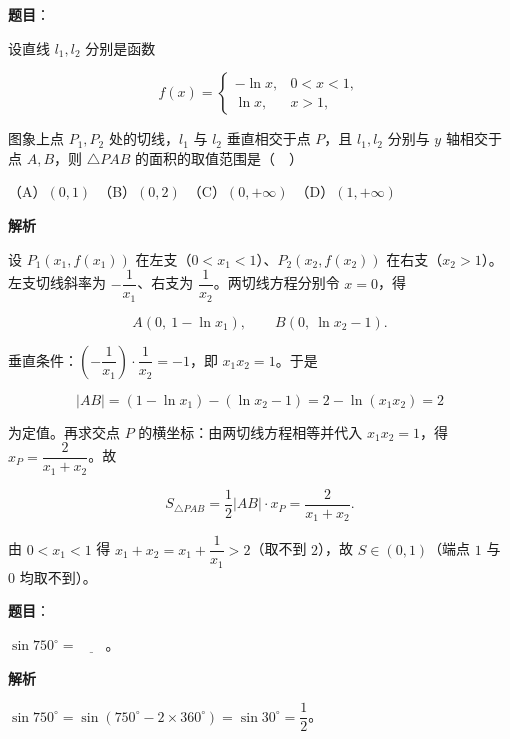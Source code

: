 \begin{answer}

\textbf{题目}：

设直线 \(l_{1},l_{2}\) 分别是函数

\nopagebreak[4]
\[
f(x)=\begin{cases}
-\ln x, & 0<x<1,\\
\ln x, & x>1,
\end{cases}
\]

图象上点 \(P_{1},P_{2}\) 处的切线，\(l_{1}\) 与 \(l_{2}\) 垂直相交于点 \(P\)，且 \(l_{1},l_{2}\) 分别与 \(y\) 轴相交于点 \(A,B\)，则 \(\triangle PAB\) 的面积的取值范围是（　）

（A）\((0,1)\)　（B）\((0,2)\)　（C）\((0,+\infty)\)　（D）\((1,+\infty)\)

\textbf{解析}

设 \(P_1(x_1,f(x_1))\) 在左支（\(0<x_1<1\)）、\(P_2(x_2,f(x_2))\) 在右支（\(x_2>1\)）。左支切线斜率为 \(-\dfrac{1}{x_1}\)、右支为 \(\dfrac{1}{x_2}\)。两切线方程分别令 \(x=0\)，得

\nopagebreak[4]
\[
A(0,\ 1-\ln x_1),\qquad B(0,\ \ln x_2-1).
\]

垂直条件：\(\left(-\dfrac{1}{x_1}\right)\cdot\dfrac{1}{x_2}=-1\)，即 \(x_1x_2=1\)。于是

\nopagebreak[4]
\[
|AB|=(1-\ln x_1)-(\ln x_2-1)=2-\ln(x_1x_2)=2
\]

为定值。再求交点 \(P\) 的横坐标：由两切线方程相等并代入 \(x_1x_2=1\)，得 \(x_P=\dfrac{2}{x_1+x_2}\)。故

\nopagebreak[4]
\[
S_{\triangle PAB}=\frac{1}{2}|AB|\cdot x_P=\frac{2}{x_1+x_2}.
\]

由 \(0<x_1<1\) 得 \(x_1+x_2=x_1+\dfrac{1}{x_1}>2\)（取不到 \(2\)），故 \(S\in(0,1)\)（端点 \(1\) 与 \(0\) 均取不到）。


\end{answer}
\begin{answer}

\textbf{题目}：

\(\sin 750^{\circ}=\underline{\qquad}\)。

\textbf{解析}

\(\sin 750^{\circ}=\sin(750^{\circ}-2\times360^{\circ})=\sin 30^{\circ}=\dfrac{1}{2}\)。


\end{answer}
